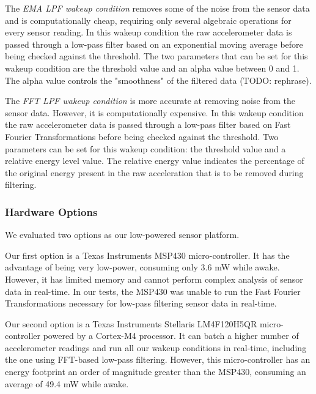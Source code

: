 The \emph{EMA LPF wakeup condition} removes some of the noise from the sensor data and is computationally cheap, requiring only several algebraic operations for every sensor reading. In this wakeup condition the raw accelerometer data is passed through a low-pass filter based on an exponential moving average before being checked against the threshold. The two parameters that can be set for this wakeup condition are the threshold value and an alpha value between 0 and 1. The alpha value controls the "smoothness" of the filtered data (TODO: rephrase).

The \emph{FFT LPF wakeup condition} is more accurate at removing noise from the sensor data. However, it is computationally expensive. In this wakeup condition the raw accelerometer data is passed through a low-pass filter based on Fast Fourier Transformations before being checked against the threshold. Two parameters can be set for this wakeup condition: the threshold value and a relative energy level value. The relative energy value indicates the percentage of the original energy present in the raw acceleration that is to be removed during filtering.  

\subsubsection{Hardware Options}

We evaluated two options as our low-powered sensor platform. 

Our first option is a Texas Instruments MSP430 micro-controller. It has the advantage of being very low-power, consuming only 3.6 mW while awake. However, it has limited memory and cannot perform complex analysis of sensor data in real-time. In our tests, the MSP430 was unable to run the Fast Fourier Transformations necessary for low-pass filtering sensor data in real-time. 

Our second option is a Texas Instruments Stellaris LM4F120H5QR micro-controller powered by a Cortex-M4 processor. It can batch a higher number of accelerometer readings and run all our wakeup conditions in real-time, including the one using FFT-based low-pass filtering. However, this micro-controller has an energy footprint an order of magnitude greater than the MSP430, consuming an average of 49.4 mW while awake.


